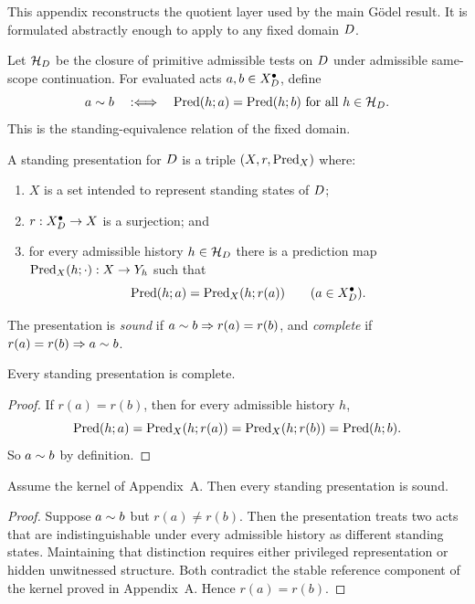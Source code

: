 \label{app:quotient}

This appendix reconstructs the quotient layer used by the main G\"odel result. It is formulated abstractly enough to apply to any fixed domain $D$.

\begin{definition}
Let $\mathcal{H}_D$ be the closure of primitive admissible tests on $D$ under admissible same-scope continuation. For evaluated acts $a,b\in X_D^{\bullet}$, define
\[
a\sim b \quad :\Longleftrightarrow \quad \mathrm{Pred}(h;a)=\mathrm{Pred}(h;b) \text{ for all } h\in\mathcal{H}_D.
\]
This is the standing-equivalence relation of the fixed domain.
\end{definition}

\begin{definition}
A standing presentation for $D$ is a triple $(X,r,\mathrm{Pred}_X)$ where:
\begin{enumerate}[label=(\roman*), leftmargin=2.5em]
    \item $X$ is a set intended to represent standing states of $D$;
    \item $r:X_D^{\bullet}\to X$ is a surjection; and
    \item for every admissible history $h\in\mathcal{H}_D$ there is a prediction map $\mathrm{Pred}_X(h;\cdot):X\to Y_h$ such that
    \[
    \mathrm{Pred}(h;a)=\mathrm{Pred}_X(h;r(a))\qquad (a\in X_D^{\bullet}).
    \]
\end{enumerate}
The presentation is \emph{sound} if $a\sim b\Rightarrow r(a)=r(b)$, and \emph{complete} if $r(a)=r(b)\Rightarrow a\sim b$.
\end{definition}

\begin{lemma}
\label{lem:C-complete}
Every standing presentation is complete.
\end{lemma}

\begin{proof}
If $r(a)=r(b)$, then for every admissible history $h$,
\[
\mathrm{Pred}(h;a)=\mathrm{Pred}_X(h;r(a))=\mathrm{Pred}_X(h;r(b))=\mathrm{Pred}(h;b).
\]
So $a\sim b$ by definition.
\end{proof}

\begin{lemma}
\label{lem:C-sound}
Assume the kernel of Appendix~A. Then every standing presentation is sound.
\end{lemma}

\begin{proof}
Suppose $a\sim b$ but $r(a)\neq r(b)$. Then the presentation treats two acts that are indistinguishable under every admissible history as different standing states. Maintaining that distinction requires either privileged representation or hidden unwitnessed structure. Both contradict the stable reference component of the kernel proved in Appendix~A. Hence $r(a)=r(b)$.
\end{proof}

